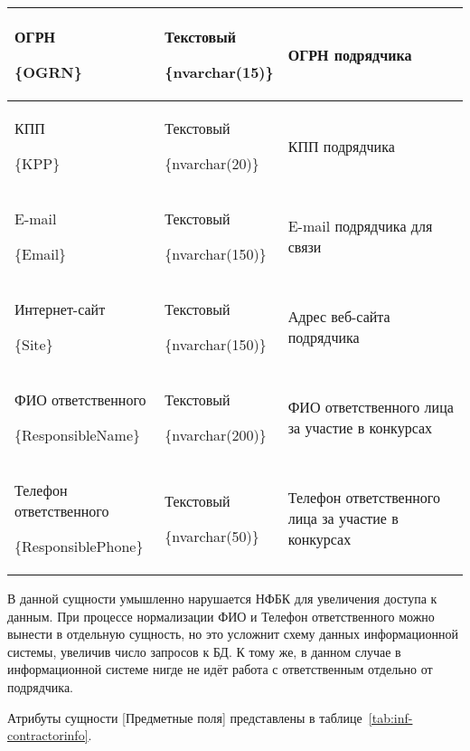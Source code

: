 \begin{myTable}
\begin{longtable}[h]{|p{}|p{}|p{}|}
	ОГРН \par \{OGRN\} & Текстовый \par \{nvarchar(15)\} & ОГРН подрядчика \\ \hline
	КПП \par \{KPP\} & Текстовый \par \{nvarchar(20)\} & КПП подрядчика \\ \hline
	E-mail \par \{Email\} & Текстовый \par \{nvarchar(150)\} & E-mail подрядчика для связи \\ \hline
	Интернет-сайт \par \{Site\} & Текстовый \par \{nvarchar(150)\} & Адрес веб-сайта подрядчика \\ \hline
	ФИО ответственного \par \{ResponsibleName\} & Текстовый \par \{nvarchar(200)\} & ФИО ответственного лица за участие в конкурсах \\ \hline
	Телефон ответственного \par \{ResponsiblePhone\} & Текстовый \par \{nvarchar(50)\} & Телефон ответственного лица за участие в конкурсах \\ \hline
\end{longtable}
\end{myTable}

В данной сущности умышленно нарушается НФБК для увеличения доступа к данным.
При процессе нормализации ФИО и Телефон ответственного можно вынести в отдельную сущность, но это усложнит схему данных информационной системы, увеличив число запросов к БД.
К тому же, в данном случае в информационной системе нигде не идёт работа с ответственным отдельно от подрядчика.

Атрибуты сущности [Предметные поля] представлены в таблице~\ref{tab:inf-contractorinfo}.

